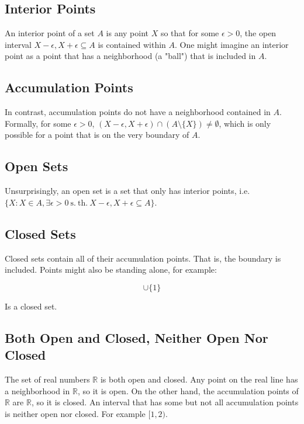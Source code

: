 \subsection{Interior Points}
An interior point of a set $A$ is any point $X$ so that for some $\epsilon > 0$, the open interval $X-\epsilon,X+\epsilon \subseteq A$ is contained within $A$. One might imagine an interior point as a point that has a neighborhood (a "ball") that is included in $A$. 

\subsection{Accumulation Points} 
In contrast, accumulation points do not have a neighborhood contained in $A$. Formally, for some $\epsilon>0$, $(X-\epsilon,X+\epsilon)\cap (A\setminus \{X\}) \neq \emptyset$, which is only possible for a point that is on the very boundary of $A$.

\subsection{Open Sets}
Unsurprisingly, an open set is a set that only has interior points, i.e. $\{X: X\in A, \exists \epsilon > 0 \mathrm{\ s.\ th.\ } X-\epsilon,X+\epsilon \subseteq A  \}$.

\subsection{Closed Sets}
Closed sets contain all of their accumulation points. That is, the boundary is included. Points might also be standing alone, for example:

\begin{equation}
[2,4]\cup\{1\}
\end{equation}

Is a closed set.

\subsection{Both Open and Closed, Neither Open Nor Closed}
The set of real numbers $\mathbb{R}$ is both open and closed. Any point on the real line has a neighborhood in $\mathbb{R}$, so it is open. On the other hand, the accumulation points of $\mathbb{R}$ are $\mathbb{R}$, so it is closed. An interval that has some but not all accumulation points is neither open nor closed. For example $[1,2)$.	



